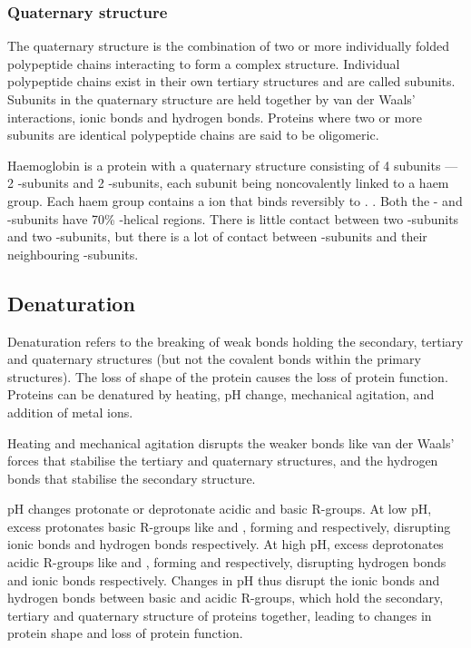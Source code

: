 \documentclass[Chemistry.tex]{subfiles}
\begin{document}
\subsubsection{Quaternary structure}
The quaternary structure is the combination of two or more individually folded polypeptide chains interacting to form a complex structure. Individual polypeptide chains exist in their own tertiary structures and are called subunits. Subunits in the quaternary structure are held together by van der Waals' interactions, ionic bonds and hydrogen bonds. Proteins where two or more subunits are identical polypeptide chains are said to be oligomeric.

Haemoglobin is a protein with a quaternary structure consisting of 4 subunits --- 2 \mupalpha-subunits and 2 \mupbeta-subunits, each subunit being noncovalently linked to a haem group. Each haem group contains a  ion that binds reversibly to . . Both the \mupalpha- and \mupbeta-subunits have 70\% \mupalpha-helical regions. There is little contact between two \mupalpha-subunits and two \mupbeta-subunits, but there is a lot of contact between \mupalpha-subunits and their neighbouring \mupbeta-subunits.
\subsection{Denaturation}
Denaturation refers to the breaking of weak bonds holding the secondary, tertiary and quaternary structures (but not the covalent bonds within the primary structures). The loss of shape of the protein causes the loss of protein function. Proteins can be denatured by heating, pH change, mechanical agitation, and addition of metal ions.

Heating and mechanical agitation disrupts the weaker bonds like van der Waals' forces that stabilise the tertiary and quaternary structures, and the hydrogen bonds that stabilise the secondary structure.

pH changes protonate or deprotonate acidic and basic R-groups. At low pH, excess  protonates basic R-groups like  and , forming  and  respectively, disrupting ionic bonds and hydrogen bonds respectively. At high pH, excess  deprotonates acidic R-groups like  and , forming  and  respectively, disrupting hydrogen bonds and ionic bonds respectively. Changes in pH thus disrupt the ionic bonds and hydrogen bonds between basic and acidic R-groups, which hold the secondary, tertiary and quaternary structure of proteins together, leading to changes in protein shape and loss of protein function.
\end{document}
